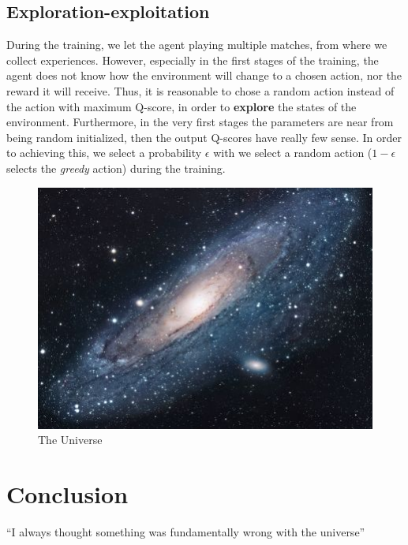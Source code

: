 \documentclass{article}
\begin{document}
\subsection{Exploration-exploitation}
During the training, we let the agent playing multiple matches, from where we collect experiences. However, especially in the first stages of the training, the agent does not know how the environment will change to a chosen action, nor the reward it will receive. Thus, it is reasonable to chose a random action instead of the action with maximum Q-score, in order to \textbf{explore} the states of the environment. Furthermore, in the very first stages the parameters are near from being random initialized, then the output Q-scores have really few sense. In order to achieving this, we select a probability $\epsilon$ with we select a random action ($1 - \epsilon$ selects the \textit{greedy} action) during the training. 

\begin{figure}[h!]
\centering
\includegraphics[scale=1.7]{universe}
\caption{The Universe}
\label{fig:universe}
\end{figure}

\section{Conclusion}
``I always thought something was fundamentally wrong with the universe'' \citep{adams1995hitchhiker}



\end{document}
